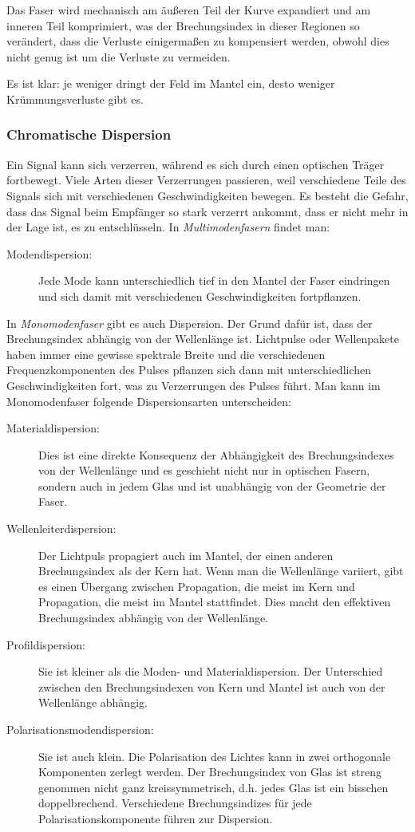 \documentclass[a4paper]{article}
\begin{document}
Das Faser wird mechanisch am äußeren Teil der Kurve expandiert und am inneren
Teil komprimiert, was der Brechungsindex in dieser Regionen so verändert, dass 
die Verluste einigermaßen zu kompensiert werden, obwohl dies nicht genug ist um
die Verluste zu vermeiden.

Es ist klar: je weniger dringt der Feld im Mantel ein, desto weniger
Krümmungsverluste gibt es. 


\subsubsection{Chromatische Dispersion}
Ein Signal kann sich verzerren, während es sich durch einen optischen
Träger fortbewegt. Viele Arten dieser Verzerrungen passieren, weil
verschiedene Teile des Signals sich mit verschiedenen Geschwindigkeiten
bewegen. Es besteht die Gefahr, dass das Signal beim Empfänger so
stark verzerrt ankommt, dass er nicht mehr in der Lage ist, es zu
entschlüsseln. In \emph{Multimodenfasern} findet man:
\begin{description}
  \item[Modendispersion:] Jede Mode kann unterschiedlich
    tief in den Mantel der Faser eindringen und sich damit mit verschiedenen
    Geschwindigkeiten fortpflanzen.
\end{description} In \emph{Monomodenfaser} gibt es auch Dispersion. Der Grund
dafür ist, dass der Brechungsindex abhängig von der Wellenlänge ist.
Lichtpulse oder Wellenpakete haben immer eine gewisse spektrale Breite und die
verschiedenen Frequenzkomponenten des Pulses pflanzen sich dann mit
unterschiedlichen Geschwindigkeiten fort, was zu Verzerrungen des Pulses führt.
Man kann im Monomodenfaser folgende Dispersionsarten unterscheiden:
\begin{description}
  \item[Materialdispersion:] Dies ist eine direkte Konsequenz der
    Abhängigkeit des Brechungsindexes von der  Wellenlänge und es geschieht
    nicht nur in optischen Fasern, sondern auch in jedem Glas und ist unabhängig von
    der Geometrie der Faser.
  \item[Wellenleiterdispersion:] Der Lichtpuls propagiert auch im Mantel,
    der einen anderen Brechungsindex als der Kern hat. Wenn man die
    Wellenlänge variiert, gibt es einen Übergang zwischen Propagation,
    die meist im Kern und Propagation, die meist im Mantel stattfindet.
    Dies macht den effektiven Brechungsindex abhängig von der Wellenlänge.
  \item[Profildispersion:] Sie ist kleiner als die Moden- und
    Materialdispersion. Der Unterschied zwischen den Brechungsindexen von Kern
    und Mantel ist auch von der Wellenlänge abhängig.
  \item[Polarisationsmodendispersion:] Sie ist auch klein. Die Polarisation des
    Lichtes kann in zwei orthogonale Komponenten zerlegt werden. Der
    Brechungsindex von Glas ist streng genommen nicht ganz kreissymmetrisch,
    d.h. jedes Glas ist ein bisschen doppelbrechend. Verschiedene
    Brechungsindizes für jede Polarisationskomponente führen zur Dispersion.
\end{description}
\end{document}
